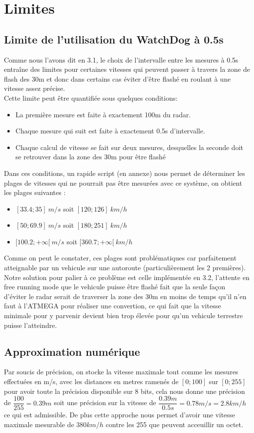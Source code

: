\documentclass[a4paper, 12pt]{article}
\begin{document}
		\section{Limites}
		\subsection{Limite de l'utilisation du WatchDog à 0.5s}
		Comme nous l'avons dit en 3.1, le choix de l'intervalle entre les mesures à 0.5s entraîne des limites pour certaines vitesses qui peuvent passer à travers la zone de flash des 30m et donc dans certains cas éviter d'être flashé en roulant à une vitesse assez précise.\\
		Cette limite peut être quantifiée sous quelques conditions:
		\begin{itemize}
			\item La première mesure est faite à exactement 100m du radar.
			\item Chaque mesure qui suit est faite à exactement 0.5s d'intervalle.
			\item Chaque calcul de vitesse se fait sur deux mesures, desquelles la seconde doit se retrouver dans la zone des 30m pour être flashé
		\end{itemize}
		Dans ces conditions, un rapide script (en annexe) nous permet de déterminer les plages de vitesses qui ne pourrait pas être mesurées avec ce système, on obtient les plages suivantes :
		\begin{itemize}
			\item $[33.4;35]\ m/s$ soit $[120;126]\ km/h$
			\item $[50;69.9]\ m/s$ soit $[180;251]\ km/h$
			\item $[100.2;+\infty[\ m/s$ soit $[360.7;+\infty[\ km/h$
		\end{itemize}
		Comme on peut le constater, ces plages sont problématiques car parfaitement atteignable par un vehicule sur une autoroute (particulièrement les 2 premières). Notre solution pour palier à ce problème est celle implémentée en 3.2, l'attente en free running mode que le vehicule puisse être flashé fait que la seule façon d'éviter le radar serait de traverser la zone des 30m en moins de temps qu'il n'en faut à l'ATMEGA pour réaliser une convertion, ce qui fait que la vitesse minimale pour y parvenir devient bien trop élevée pour qu'un vehicule terrestre puisse l'atteindre.
	
		\subsection{Approximation numérique}
		Par soucis de précision, on stocke la vitesse maximale tout comme les mesures effectuées en m/s, avec les distances en metres ramenés de $[0;100]$ sur $[0;255]$ pour avoir toute la précision disponible sur 8 bits, cela nous donne une précision de $\dfrac{100}{255} = 0.39m$ soit une précision sur la vitesse de $\dfrac{0.39m}{0.5s} = 0.78m/s = 2.8 km/h$ ce qui est admissible. De plus cette approche nous permet d'avoir une vitesse maximale mesurable de $380km/h$ contre les 255 que peuvent acceuillir un octet.
 		
\end{document}
